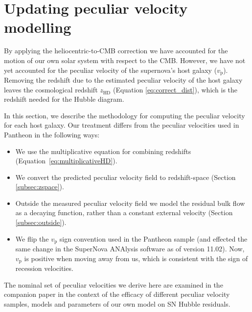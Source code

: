 \documentclass[
  journal=pasa,
  manuscript=research-paper,
  year=2022,
]{cup-journal}
\newcommand{\SNANA}{\texttt{SNANA}}
\newcommand{\zHD}[1]{\ensuremath{z_{\text{HD}}^{\mathrm{#1}}}}
\newcommand{\vp}{\ensuremath{v_{\text{p}}}}
\begin{document}
\section{Updating peculiar velocity modelling}\label{sec:pv}
By applying the heliocentric-to-CMB correction we have accounted for the motion of our own solar system with respect to the CMB.
However, we have not yet accounted for the peculiar velocity of the supernova's host galaxy ($\vp{}$).
Removing the redshift due to the estimated peculiar velocity of the host galaxy leaves the cosmological redshift \zHD{} (Equation \ref{eq:correct_dist}), which is the redshift needed for the Hubble diagram.

In this section, we describe the methodology for computing the peculiar velocity for each host galaxy.
Our treatment differs from the peculiar velocities used in Pantheon in the following ways:
\begin{itemize}
    \item We use the multiplicative equation for combining redshifts (Equation~\ref{eq:multiplicativeHD}). 
    \item We convert the predicted peculiar velocity field to redshift-space (Section \ref{subsec:zspace}).
    \item Outside the measured peculiar velocity field we model the residual bulk flow as a decaying function, rather than a constant external velocity (Section \ref{subsec:outside}).
    \item We flip the $\vp$ sign convention used in the Pantheon sample (and effected the same change in the SuperNova ANAlysis software \citep[\SNANA,][]{Kessler2009} as of version 11.02). Now, $\vp$ is positive when moving away from us, which is consistent with the sign of recession velocities. 
\end{itemize}
The nominal set of peculiar velocities we derive here are examined in the companion paper \citet{Peterson2021} in the context of the efficacy of different peculiar velocity samples, models and parameters of our own model on SN Hubble residuals.  
\end{document}
